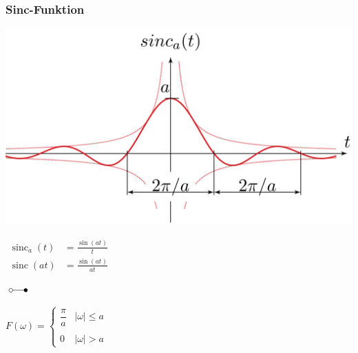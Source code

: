 		\subsubsection{Sinc-Funktion}
			\begin{minipage}{0.2\textwidth}
				\includegraphics[width=\textwidth]{./bilder/funktionen/sincF.png}
			\end{minipage}
			\qquad
			\begin{minipage}{0.3\textwidth}
				\begin{math}
					\begin{aligned}
						\operatorname{sinc}_{a}(t) &= \frac{\sin (a t)}{t} \\
						\operatorname{sinc}(a t) &= \frac{\sin (a t)}{a t}
					\end{aligned}
				\end{math}
			\end{minipage}$\; \laplace \quad $
			\begin{minipage}{0.3\textwidth}						
			$F(\omega)=\begin{cases}
				\dfrac{\pi}{a} & |\omega| \leq a \\ \\
				{0} & |\omega|>a
				\end{cases}
  			$
			\end{minipage}\\
	
	
	